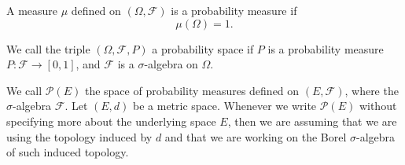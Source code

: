 \begin{definition}
	A measure $\mu$ defined on $(\Omega, \mathcal F)$ is a probability measure if
	\begin{equation}
		\mu(\Omega) = 1.
	\end{equation}
\end{definition}

\begin{definition}
	We call the triple $(\Omega, \mathcal F, P)$ a probability space if $P$ is
	a probability measure $P: \mathcal F \to [0,1]$, and $\mathcal F$ is a
	$\sigma$-algebra on $\Omega$.
\end{definition}

\begin{definition}
	We call $\mathcal P(E)$ the space of probability measures defined
	on $(E,\mathcal F)$, where the $\sigma$-algebra $\mathcal F$.
	Let $(E,d)$ be a metric space. Whenever we write $\mathcal P(E)$
	without specifying more about the underlying space $E$, then
	we are assuming that we are using the topology induced by $d$
	and that we are working on the Borel $\sigma$-algebra
	of such induced topology.
\end{definition}

